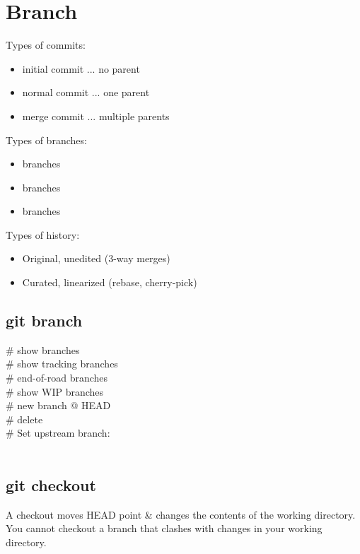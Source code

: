 \section{Branch}
Types of commits:
\begin{itemize}
    \item initial commit ... no parent
    \item normal commit ... one parent
    \item merge commit ... multiple parents
\end{itemize}
Types of branches:
\begin{itemize}
    \item {} branches
    \item {} branches
    \item {} branches
\end{itemize}
Types of history:
\begin{itemize}
    \item Original, unedited (3-way merges)
    \item Curated, linearized (rebase, cherry-pick)
\end{itemize}

\subsection*{git branch}
 \# show branches \\
 \# show tracking branches \\
 \# end-of-road branches \\
 \# show WIP branches \\
 \# new branch @ HEAD \\
 \# delete \\
\# Set upstream branch:\\
 \\


\subsection*{git checkout}
A checkout moves HEAD point \& changes the contents of the working directory.  
You cannot checkout a branch that clashes with changes in your working directory.

